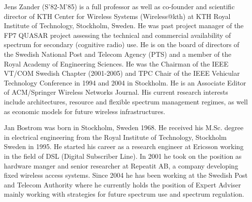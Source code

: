 \documentclass[journal]{IEEEtran}
\begin{document}
\begin{IEEEbiography}{Jens Zander}
(S'82-M'85) is a full professor as well as co-founder and scientific director of KTH Center for Wireless Systems (Wireless@kth) at KTH Royal Institute of Technology, Stockholm, Sweden. He was past project manager of the FP7 QUASAR project assessing the technical and commercial availability of spectrum for secondary (cognitive radio) use. He is on the board of directors of the Swedish National Post and Telecom Agency (PTS) and a member of the Royal Academy of Engineering Sciences. He was the Chairman of the IEEE VT/COM Swedish Chapter (2001-2005) and TPC Chair of the IEEE Vehicular Technology Conference in 1994 and 2004 in Stockholm. He is an Associate Editor of ACM/Springer Wireless Networks Journal. His current research interests include architectures, resource and flexible spectrum management regimes, as well as economic models for future wireless infrastructures.
\end{IEEEbiography}

\begin{IEEEbiography}{Jan Bostrom}
was born in Stockholm, Sweden 1968. He received his M.Sc. degree in electrical engineering from the Royal Institute of Technology, Stockholm Sweden in 1995. He started his career as a research engineer at Ericsson working in the field of DSL (Digital Subscriber Line). In 2001 he took on the position as hardware manger and senior researcher at Repeatit AB, a company developing fixed wireless access systems.  Since 2004 he has been working at the Swedish Post and Telecom Authority where he currently holds the position of Expert Adviser mainly working with strategies for future spectrum use and spectrum regulation.
\end{IEEEbiography}
\end{document}
